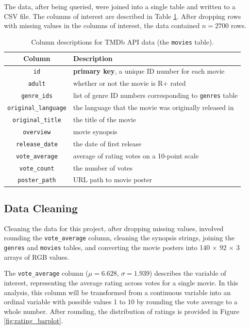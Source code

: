 \documentclass[12pt, oneside]{article}   	%
\begin{document}
The data, after being queried, were joined into a single table and written to a CSV file. The columns of interest are described in Table \ref{table:cols_of_interest}. After dropping rows with missing values in the columns of interest, the data contained $n=2700$ rows.

\begin{table}
\begin{center}\begin{tabular}{c|l}
\textbf{Column} & \textbf{Description} \\ \hline
\texttt{id} & \textbf{primary key}, a unique ID number for each movie \\
\texttt{adult} & whether or not the movie is R+ rated \\
\texttt{genre\_ids} & list of genre ID numbers corresponding to \texttt{genres} table \\
\texttt{original\_language} & the language that the movie was originally released in \\
\texttt{original\_title} & the title of the movie \\
\texttt{overview} & movie synopsis \\
\texttt{release\_date} & the date of first release \\
\texttt{vote\_average} & average of rating votes on a 10-point scale \\
\texttt{vote\_count} & the number of votes \\
\texttt{poster\_path} & URL path to movie poster \\
\end{tabular}\end{center}
\caption{\label{table:cols_of_interest}Column descriptions for TMDb API data (the \texttt{movies} table).}
\end{table}

\subsection{Data Cleaning}

Cleaning the data for this project, after dropping missing values, involved rounding the \texttt{vote\_average} column, cleaning the synopsis strings, joining the \texttt{genres} and \texttt{movies} tables, and converting the movie posters into 140 $\times$ 92 $\times$ 3 arrays of RGB values.

The \texttt{vote\_average} column ($\mu = 6.628$, $\sigma = 1.939$) describes the variable of interest, representing the average rating across votes for a single movie. In this analysis, this column will be transformed from a continuous variable into an ordinal variable with possible values 1 to 10 by rounding the vote average to a whole number. After rounding, the distribution of ratings is provided in Figure \ref{fig:rating_barplot}.
\end{document}
